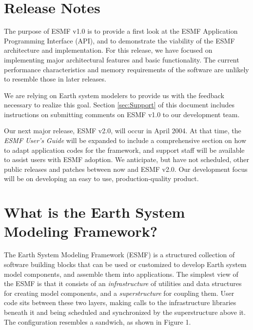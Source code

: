 
\section{Release Notes}

The purpose of ESMF v1.0 is to provide a first look at the ESMF
Application Programming Interface (API), and to demonstrate the viability 
of the ESMF architecture and implementation.  For this release, we have focused 
on implementing major architectural features and basic functionality.  The 
current performance characteristics and memory requirements of the software 
are unlikely to resemble those in later releases.  

We are relying on Earth system modelers to provide us with the feedback necessary 
to realize this goal.  Section \ref{sec:Support} of this document includes 
instructions on submitting comments on ESMF v1.0 to our development team.

Our next major release, ESMF v2.0, will occur in April 2004.  At that time, 
the {\it ESMF User's Guide} will be expanded to include a comprehensive section 
on how to adapt application codes for the framework, and support staff will be 
available to assist users with ESMF adoption.  We anticipate, but have 
not scheduled, other public releases and patches between now and ESMF v2.0.  
Our development focus will be on developing an easy to use, production-quality 
product.  

\section{What is the Earth System Modeling Framework?}

The Earth System Modeling Framework (ESMF) is a structured collection of 
software building blocks that can be used or customized to develop 
Earth system model components, and assemble them into applications.  
The simplest view of the ESMF is that it consists of an {\it infrastructure} 
of utilities and data structures for creating 
model components, and a {\it superstructure} for coupling them.  
User code sits between these two layers, making calls to the infrastructure
libraries beneath it and being scheduled and synchronized by the 
superstructure above it.  The configuration resembles a sandwich, as
shown in Figure 1.

